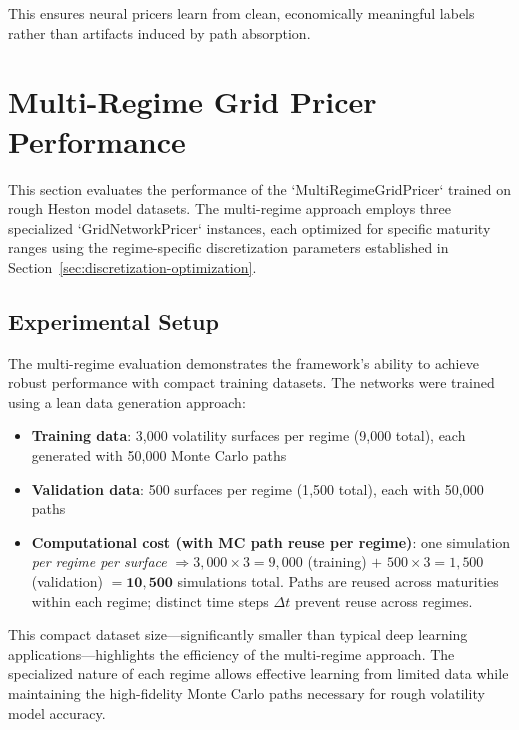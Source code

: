 	This ensures neural pricers learn from clean, economically meaningful labels rather than artifacts induced by path absorption.
	
	\section{Multi-Regime Grid Pricer Performance}
	\label{sec:multiregime-results}
	
	This section evaluates the performance of the `MultiRegimeGridPricer` trained on rough Heston model datasets. The multi-regime approach employs three specialized `GridNetworkPricer` instances, each optimized for specific maturity ranges using the regime-specific discretization parameters established in Section~\ref{sec:discretization-optimization}.
	
	\subsection{Experimental Setup}
	
	The multi-regime evaluation demonstrates the framework's ability to achieve robust performance with compact training datasets. The networks were trained using a lean data generation approach:
	
	\begin{itemize}[nosep]
		\item \textbf{Training data}: 3{,}000 volatility surfaces per regime (9{,}000 total), each generated with 50{,}000 Monte Carlo paths
		\item \textbf{Validation data}: 500 surfaces per regime (1{,}500 total), each with 50{,}000 paths
		\item \textbf{Computational cost (with MC path reuse per regime)}: 
		one simulation \emph{per regime per surface} 
		$\Rightarrow 3{,}000 \times 3 = 9{,}000$ (training) $+$ 
		$500 \times 3 = 1{,}500$ (validation) 
		$= \mathbf{10{,}500}$ simulations total. 
		Paths are reused across maturities within each regime; distinct time steps $\Delta t$ prevent reuse across regimes.
	\end{itemize}
	
	This compact dataset size—significantly smaller than typical deep learning applications—highlights the efficiency of the multi-regime approach. The specialized nature of each regime allows effective learning from limited data while maintaining the high-fidelity Monte Carlo paths necessary for rough volatility model accuracy.
	
